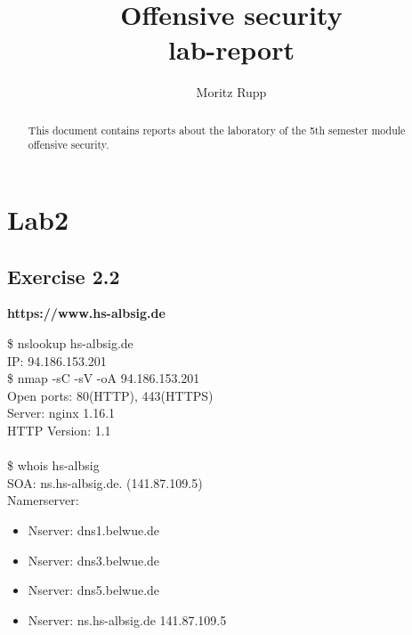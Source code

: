 \documentclass[a4paper,10pt]{article}
\title{Offensive security\\lab-report}
\author{Moritz Rupp}
\begin{document}
\maketitle

\begin{abstract}
\noindent This document contains reports about the laboratory of the 5th semester module offensive security. 
\end{abstract}
\tableofcontents
\newpage
\section{Lab2}
\subsection{Exercise 2.2}
\begin{center}
\textbf{https://www.hs-albsig.de} 
\end{center}
\$\raisebox{-0.9ex}{\~{}} nslookup hs-albsig.de \\
IP: 94.186.153.201\\ 


\noindent\$\raisebox{-0.9ex}{\~{}} nmap -sC -sV -oA 94.186.153.201\\
Open ports: 80(HTTP), 443(HTTPS)\\
Server: nginx 1.16.1\\
HTTP Version: 1.1 
\\
\\
\$\raisebox{-0.9ex}{\~{}} whois hs-albsig\\
SOA: ns.hs-albsig.de. (141.87.109.5)\\  
Namerserver:
\begin{itemize}
\item Nserver: dns1.belwue.de
\item Nserver: dns3.belwue.de
\item Nserver: dns5.belwue.de
\item Nserver: ns.hs-albsig.de 141.87.109.5
\end{itemize}
\end{document}
